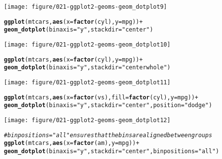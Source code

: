 \documentclass[a4paper,titlepage]{tufte-handout}\usepackage[]{graphicx}\usepackage[]{color}
\makeatletter
\def\maxwidth{ %
  \ifdim\Gin@nat@width>\linewidth
    \linewidth
  \else
    \Gin@nat@width
  \fi
}
\newcommand{\hlstr}[1]{\textcolor[rgb]{0.192,0.494,0.8}{#1}}%
\newcommand{\hlcom}[1]{\textcolor[rgb]{0.678,0.584,0.686}{\textit{#1}}}%
\newcommand{\hlopt}[1]{\textcolor[rgb]{0,0,0}{#1}}%
\newcommand{\hlstd}[1]{\textcolor[rgb]{0.345,0.345,0.345}{#1}}%
\newcommand{\hlkwc}[1]{\textcolor[rgb]{0.333,0.667,0.333}{#1}}%
\newcommand{\hlkwd}[1]{\textcolor[rgb]{0.737,0.353,0.396}{\textbf{#1}}}%
\newenvironment{kframe}{%
 \def\at@end@of@kframe{}%
 \ifinner\ifhmode%
  \def\at@end@of@kframe{\end{minipage}}%
  \begin{minipage}{\columnwidth}%
 \fi\fi%
 \def\FrameCommand##1{\hskip\@totalleftmargin \hskip-\fboxsep
 \colorbox{shadecolor}{##1}\hskip-\fboxsep
     \hskip-\linewidth \hskip-\@totalleftmargin \hskip\columnwidth}%
 \MakeFramed {\advance\hsize-\width
   \@totalleftmargin\z@ \linewidth\hsize
   \@setminipage}}%
 {\par\unskip\endMakeFramed%
 \at@end@of@kframe}
\newenvironment{knitrout}{}{} %
\makeatother
\begin{document}
\begin{knitrout}
\begin{kframe}
{\ttfamily\noindent\itshape\color{messagecolor}{\#\# stat\_bindot: binwidth defaulted to range/30. Use 'binwidth = x' to adjust this.}}\end{kframe}
\texttt{[image: figure/021-ggplot2-geoms-geom\_dotplot9]} 
\begin{kframe}\begin{alltt}
\hlkwd{ggplot}\hlstd{(mtcars,} \hlkwd{aes}\hlstd{(}\hlkwc{x} \hlstd{=} \hlkwd{factor}\hlstd{(cyl),} \hlkwc{y} \hlstd{= mpg))} \hlopt{+}
  \hlkwd{geom_dotplot}\hlstd{(}\hlkwc{binaxis} \hlstd{=} \hlstr{"y"}\hlstd{,} \hlkwc{stackdir} \hlstd{=} \hlstr{"center"}\hlstd{)}
\end{alltt}


{\ttfamily\noindent\itshape\color{messagecolor}{\#\# stat\_bindot: binwidth defaulted to range/30. Use 'binwidth = x' to adjust this.}}\end{kframe}
\texttt{[image: figure/021-ggplot2-geoms-geom\_dotplot10]} 
\begin{kframe}\begin{alltt}
\hlkwd{ggplot}\hlstd{(mtcars,} \hlkwd{aes}\hlstd{(}\hlkwc{x} \hlstd{=} \hlkwd{factor}\hlstd{(cyl),} \hlkwc{y} \hlstd{= mpg))} \hlopt{+}
  \hlkwd{geom_dotplot}\hlstd{(}\hlkwc{binaxis} \hlstd{=} \hlstr{"y"}\hlstd{,} \hlkwc{stackdir} \hlstd{=} \hlstr{"centerwhole"}\hlstd{)}
\end{alltt}


{\ttfamily\noindent\itshape\color{messagecolor}{\#\# stat\_bindot: binwidth defaulted to range/30. Use 'binwidth = x' to adjust this.}}\end{kframe}
\texttt{[image: figure/021-ggplot2-geoms-geom\_dotplot11]} 
\begin{kframe}\begin{alltt}
\hlkwd{ggplot}\hlstd{(mtcars,} \hlkwd{aes}\hlstd{(}\hlkwc{x} \hlstd{=} \hlkwd{factor}\hlstd{(vs),} \hlkwc{fill} \hlstd{=} \hlkwd{factor}\hlstd{(cyl),} \hlkwc{y} \hlstd{= mpg))} \hlopt{+}
  \hlkwd{geom_dotplot}\hlstd{(}\hlkwc{binaxis} \hlstd{=} \hlstr{"y"}\hlstd{,} \hlkwc{stackdir} \hlstd{=} \hlstr{"center"}\hlstd{,} \hlkwc{position} \hlstd{=} \hlstr{"dodge"}\hlstd{)}
\end{alltt}


{\ttfamily\noindent\itshape\color{messagecolor}{\#\# stat\_bindot: binwidth defaulted to range/30. Use 'binwidth = x' to adjust this.}}\end{kframe}
\texttt{[image: figure/021-ggplot2-geoms-geom\_dotplot12]} 
\begin{kframe}\begin{alltt}
\hlcom{# binpositions="all" ensures that the bins are aligned between groups}
\hlkwd{ggplot}\hlstd{(mtcars,} \hlkwd{aes}\hlstd{(}\hlkwc{x} \hlstd{=} \hlkwd{factor}\hlstd{(am),} \hlkwc{y} \hlstd{= mpg))} \hlopt{+}
  \hlkwd{geom_dotplot}\hlstd{(}\hlkwc{binaxis} \hlstd{=} \hlstr{"y"}\hlstd{,} \hlkwc{stackdir} \hlstd{=} \hlstr{"center"}\hlstd{,} \hlkwc{binpositions}\hlstd{=}\hlstr{"all"}\hlstd{)}
\end{alltt}



\end{kframe}
\end{knitrout}
\end{document}
